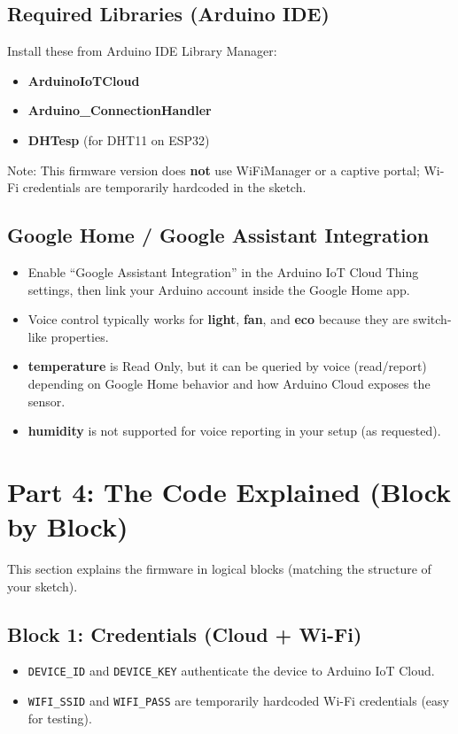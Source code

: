 \documentclass[12pt,a4paper]{article}
\begin{document}
\subsection{Required Libraries (Arduino IDE)}

Install these from Arduino IDE Library Manager:

\begin{itemize}
\item \textbf{ArduinoIoTCloud}
\item \textbf{Arduino\_ConnectionHandler}
\item \textbf{DHTesp} (for DHT11 on ESP32)
\end{itemize}

Note: This firmware version does \textbf{not} use WiFiManager or a captive portal; Wi-Fi credentials are temporarily hardcoded in the sketch.

\subsection{Google Home / Google Assistant Integration}

\begin{itemize}
\item Enable ``Google Assistant Integration'' in the Arduino IoT Cloud Thing settings, then link your Arduino account inside the Google Home app.
\item Voice control typically works for \textbf{light}, \textbf{fan}, and \textbf{eco} because they are switch-like properties.
\item \textbf{temperature} is Read Only, but it can be queried by voice (read/report) depending on Google Home behavior and how Arduino Cloud exposes the sensor.
\item \textbf{humidity} is not supported for voice reporting in your setup (as requested).
\end{itemize}

\newpage
\section{Part 4: The Code Explained (Block by Block)}

This section explains the firmware in logical blocks (matching the structure of your sketch).

\subsection{Block 1: Credentials (Cloud + Wi-Fi)}
\begin{itemize}
\item \texttt{DEVICE\_ID} and \texttt{DEVICE\_KEY} authenticate the device to Arduino IoT Cloud.
\item \texttt{WIFI\_SSID} and \texttt{WIFI\_PASS} are temporarily hardcoded Wi-Fi credentials (easy for testing).
\end{itemize}
\end{document}
